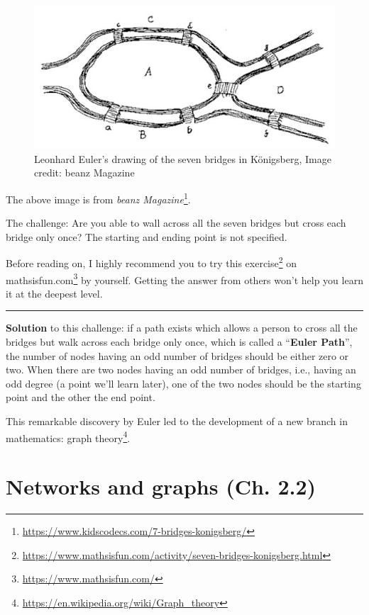 \documentclass[
]{krantz}
\renewcommand{\href}[2]{#2\footnote{\url{#1}}}
\begin{document}
\begin{figure}

{\centering \includegraphics[width=0.7\linewidth]{./images/bridge} 

}

\caption{Leonhard Euler's drawing of the seven bridges in Königsberg, Image credit: beanz Magazine}\label{fig:unnamed-chunk-14}
\end{figure}

The above image is from \href{https://www.kidscodecs.com/7-bridges-konigsberg/}{\emph{beanz Magazine}}.

The challenge: Are you able to wall across all the seven bridges but cross each bridge only once? The starting and ending point is not specified.

Before reading on, I highly recommend you to try \href{https://www.mathsisfun.com/activity/seven-bridges-konigsberg.html}{this exercise} on \href{https://www.mathsisfun.com/}{mathsisfun.com} by yourself. Getting the answer from others won't help you learn it at the deepest level.

\begin{center}\rule{0.5\linewidth}{0.5pt}\end{center}

\textbf{Solution} to this challenge: if a path exists which allows a person to cross all the bridges but walk across each bridge only once, which is called a ``\textbf{Euler Path}'', the number of nodes having an odd number of bridges should be either zero or two. When there are two nodes having an odd number of bridges, i.e., having an odd degree (a point we'll learn later), one of the two nodes should be the starting point and the other the end point.

This remarkable discovery by Euler led to the development of a new branch in mathematics: \href{https://en.wikipedia.org/wiki/Graph_theory}{graph theory}.

\hypertarget{networks-and-graphs-ch.-2.2}{%
\section{Networks and graphs (Ch. 2.2)}\label{networks-and-graphs-ch.-2.2}}
\end{document}
